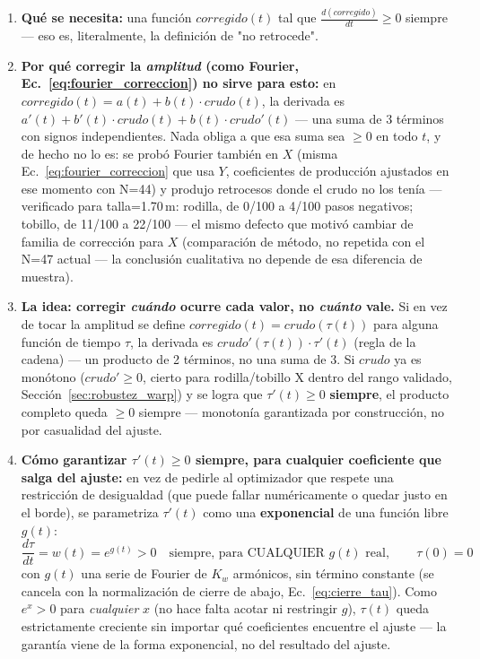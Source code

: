 \documentclass[11pt,a4paper]{scrartcl}
\begin{document}
\begin{enumerate}
\item \textbf{Qué se necesita:} una función $corregido(t)$ tal que $\frac{d(corregido)}{dt}\geq0$ siempre --- eso es, literalmente, la definición de "no retrocede".
\item \textbf{Por qué corregir la \emph{amplitud} (como Fourier, Ec.~\ref{eq:fourier_correccion}) no sirve para esto:} en $corregido(t)=a(t)+b(t)\cdot crudo(t)$, la derivada es $a'(t)+b'(t)\cdot crudo(t)+b(t)\cdot crudo'(t)$ --- una suma de 3 términos con signos independientes. Nada obliga a que esa suma sea $\geq0$ en todo $t$, y de hecho no lo es: se probó Fourier también en $X$ (misma Ec.~\ref{eq:fourier_correccion} que usa $Y$, coeficientes de producción ajustados en ese momento con N=44) y produjo retrocesos donde el crudo no los tenía --- verificado para talla=1.70\,m: rodilla, de 0/100 a 4/100 pasos negativos; tobillo, de 11/100 a 22/100 --- el mismo defecto que motivó cambiar de familia de corrección para $X$ (comparación de método, no repetida con el N=47 actual --- la conclusión cualitativa no depende de esa diferencia de muestra).
\item \textbf{La idea: corregir \emph{cuándo} ocurre cada valor, no \emph{cuánto} vale.} Si en vez de tocar la amplitud se define $corregido(t)=crudo(\tau(t))$ para alguna función de tiempo $\tau$, la derivada es $crudo'(\tau(t))\cdot\tau'(t)$ (regla de la cadena) --- un producto de 2 términos, no una suma de 3. Si $crudo$ ya es monótono ($crudo'\geq0$, cierto para rodilla/tobillo X dentro del rango validado, Sección~\ref{sec:robustez_warp}) y se logra que $\tau'(t)\geq0$ \textbf{siempre}, el producto completo queda $\geq0$ siempre --- monotonía garantizada por construcción, no por casualidad del ajuste.
\item \textbf{Cómo garantizar $\tau'(t)\geq0$ siempre, para cualquier coeficiente que salga del ajuste:} en vez de pedirle al optimizador que respete una restricción de desigualdad (que puede fallar numéricamente o quedar justo en el borde), se parametriza $\tau'(t)$ como una \textbf{exponencial} de una función libre $g(t)$:
\begin{equation}
\frac{d\tau}{dt} = w(t) = e^{g(t)} > 0 \quad \text{siempre, para CUALQUIER $g(t)$ real}, \qquad \tau(0) = 0
\label{eq:warp_ode}
\end{equation}
con $g(t)$ una serie de Fourier de $K_w$ armónicos, sin término constante (se cancela con la normalización de cierre de abajo, Ec.~\ref{eq:cierre_tau}). Como $e^x>0$ para \emph{cualquier} $x$ (no hace falta acotar ni restringir $g$), $\tau(t)$ queda estrictamente creciente sin importar qué coeficientes encuentre el ajuste --- la garantía viene de la forma exponencial, no del resultado del ajuste.
\end{enumerate}
\end{document}
